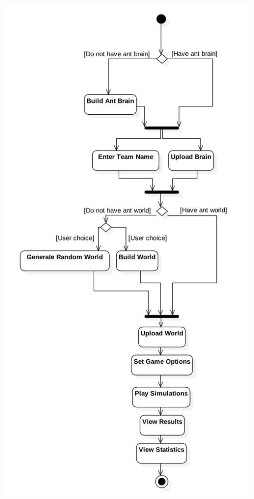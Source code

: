 \documentclass[11pt]{article}
\begin{document}
\begin{center}
\includegraphics[width=\textwidth,height=\textheight,keepaspectratio]{high-level-diagrams/process-model.png}
\end{center}
\end{document}
